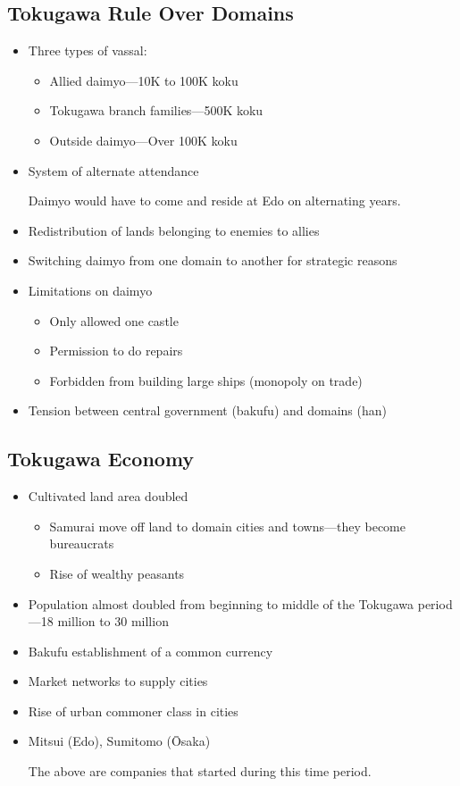 \documentclass[class=article, crop=false]{standalone}
\begin{document}
  \subsection{Tokugawa Rule Over Domains}
  \begin{itemize}
    \item Three types of vassal:
    \begin{itemize}
      \item Allied daimyo---10K to 100K koku
      \item Tokugawa branch families---500K koku
      \item Outside daimyo---Over 100K koku
    \end{itemize}
    \item System of alternate attendance
    \begin{note}{}
      Daimyo would have to come and reside at Edo on alternating years.
    \end{note}
    \item Redistribution of lands belonging to enemies to allies
    \item Switching daimyo from one domain to another for strategic reasons 
    \item Limitations on daimyo
    \begin{itemize}
      \item Only allowed one castle
      \item Permission to do repairs
      \item Forbidden from building large ships (monopoly on trade)
    \end{itemize}
    \item Tension between central government (bakufu) and domains (han)
  \end{itemize}
  \subsection{Tokugawa Economy}
  \begin{itemize}
    \item Cultivated land area doubled
    \begin{itemize}
      \item Samurai move off land to domain cities and towns---they become bureaucrats
      \item Rise of wealthy peasants
    \end{itemize}
    \item Population almost doubled from beginning to middle of the Tokugawa period---18 million to $30$ million
    \item Bakufu establishment of a common currency
    \item Market networks to supply cities
    \item Rise of urban commoner class in cities
    \item Mitsui (Edo), Sumitomo (\=Osaka)
    \begin{note}{}
      The above are companies that started during this time period.
    \end{note}
  \end{itemize}
\end{document}
